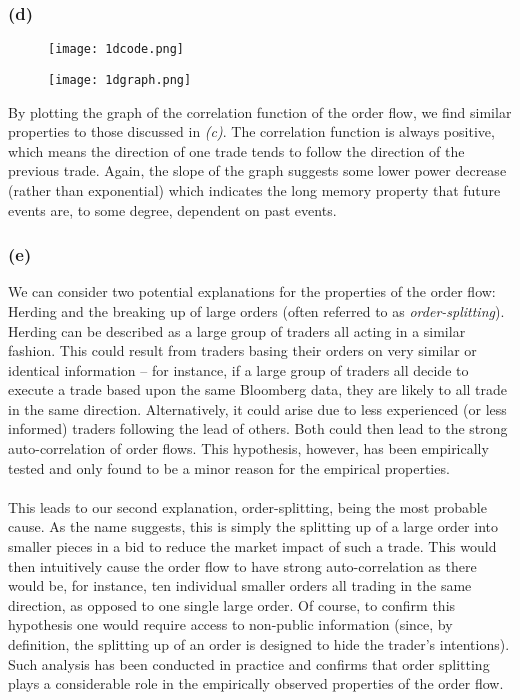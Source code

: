 \documentclass{article}
\begin{document}
\newpage
\subsubsection*{(d)}

\begin{figure}[h]
\texttt{[image: 1dcode.png]}
\centering
\end{figure}

\begin{figure}[h]
\texttt{[image: 1dgraph.png]}
\centering
\end{figure}

By plotting the graph of the correlation function of the order flow, we find similar properties to those discussed in  \textit{(c)}. The correlation function is always positive, which means the direction of one trade tends to follow the direction of the previous trade. Again, the slope of the graph suggests some lower power decrease (rather than exponential) which indicates the long memory property that future events are, to some degree, dependent on past events. 

\newpage
\subsubsection*{(e)}
We can consider two potential explanations for the properties of the order flow: Herding and the breaking up of large orders (often referred to as \textit{order-splitting}).
Herding can be described as a large group of traders all acting in a similar fashion. This could result from traders basing their orders on very similar or identical information – for instance, if a large group of traders all decide to execute a trade based upon the same Bloomberg data, they are likely to all trade in the same direction. Alternatively, it could arise due to less experienced (or less informed) traders following the lead of others. Both could then lead to the strong auto-correlation of order flows. This hypothesis, however, has been empirically tested and only found to be a minor reason for the empirical properties. 
\\
\\ This leads to our second explanation, order-splitting, being the most probable cause. As the name suggests, this is simply the splitting up of a large order into smaller pieces in a bid to reduce the market impact of such a trade. This would then intuitively cause the order flow to have strong auto-correlation as there would be, for instance, ten individual smaller orders all trading in the same direction, as opposed to one single large order. Of course, to confirm this hypothesis one would require access to non-public information (since, by definition, the splitting up of an order is designed to hide the trader’s intentions). Such analysis has been conducted in practice and confirms that order splitting plays a considerable role in the empirically observed properties of the order flow. 
\end{document}
